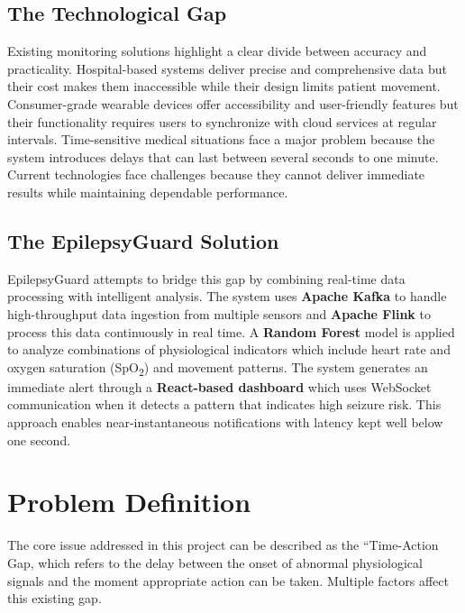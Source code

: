 \documentclass[12pt, a4paper, oneside]{report}
\begin{document}
\subsection{The Technological Gap}

Existing monitoring solutions highlight a clear divide between accuracy and practicality. Hospital-based systems deliver precise and comprehensive data but their cost makes them inaccessible while their design limits patient movement. Consumer-grade wearable devices offer accessibility and user-friendly features but their functionality requires users to synchronize with cloud services at regular intervals. Time-sensitive medical situations face a major problem because the system introduces delays that can last between several seconds to one minute. Current technologies face challenges because they cannot deliver immediate results while maintaining dependable performance.

\subsection{The EpilepsyGuard Solution}

EpilepsyGuard attempts to bridge this gap by combining real-time data processing with intelligent analysis. The system uses \textbf{Apache Kafka} to handle high-throughput data ingestion from multiple sensors and \textbf{Apache Flink} to process this data continuously in real time. A \textbf{Random Forest} model is applied to analyze combinations of physiological indicators which include heart rate and oxygen saturation (SpO\textsubscript{2}) and movement patterns. The system generates an immediate alert through a \textbf{React-based dashboard} which uses WebSocket communication when it detects a pattern that indicates high seizure risk. This approach enables near-instantaneous notifications with latency kept well below one second.

\section{Problem Definition}

The core issue addressed in this project can be described as the ``Time-Action Gap, which refers to the delay between the onset of abnormal physiological signals and the moment appropriate action can be taken. Multiple factors affect this existing gap.
\end{document}
